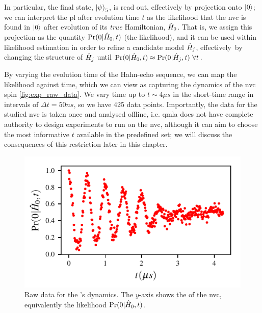 In particular, the final state, $\ket{\psi}_5$, is read out, effectively by projection onto $\ket{0}$;
    we can interpret the \gls{pl} after evolution time $t$ as the \gls{likelihood} 
    that the \gls{nvc} is found in $\ket{0}$ after evolution of its \emph{true} Hamiltonian, $\hat{H}_0$. 
That is, we assign this projection as the quantity $\Pr(0 | \hat{H}_0, t)$ (the \gls{likelihood}), 
    and it can be used within likelihood estimation in order to refine a candidate model $\hat{H}_j$, 
    effectively\footnotemark \ by changing the structure of 
    $\hat{H}_j$ until $\Pr(0 | \hat{H}_0, t) \approx \Pr(0 | \hat{H}_j, t) \ \forall t$. 

\par 

By varying the evolution time of the Hahn-echo sequence, we can map the likelihood 
    against time, which we can view as capturing the dynamics of the \gls{nvc} spin \cref{fig:exp_raw_data}.
We vary time up to $t \sim 4 \mu s$ in the short-time range in intervals of $\Delta t = 50 ns$, 
    so we have 425 data points. 
Importantly, the data for the studied \gls{nvc} is taken once and analysed offline, 
    i.e. \gls{qmla} does not have complete authority to design experiments 
    to run on the \gls{nvc}, although it can aim to choose the most informative $t$ 
    available in the predefined set; we will discuss the consequences of this restriction 
    later in this chapter. 

\begin{figure}
    \begin{center}
        \includegraphics{experimental_study/figures/raw_data.pdf}
    \end{center}
    \caption[Raw data for the 's dynamics.]{
        Raw data for the 's dynamics.
        The $y$-axis shows the  of the \gls{nvc}, 
        equivalently the likelihood $\Pr(0 | \hat{H}_0, t)$. 
    }
    \label{fig:nv_raw_data}
\end{figure}


